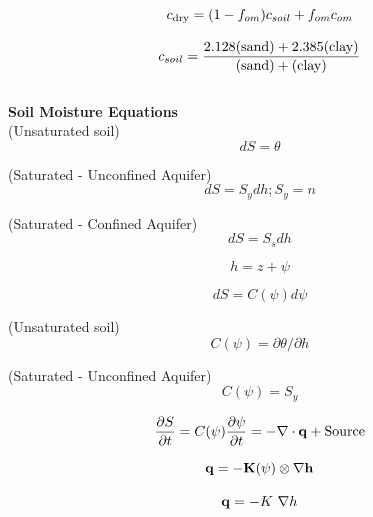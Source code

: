 \documentclass{article}
\begin{document}
\begin{equation}
c_{\rm dry} = (1-f_{om})c_{soil} + f_{om}c_{om}
\end{equation}

\begin{equation}
c_{soil} = {\rm \frac{2.128 (sand)+ 2.385 (clay)}{(sand) + (clay)}}
\end{equation}  \\



\textbf{Soil Moisture Equations} \\

(Unsaturated soil)
\begin{equation}
 dS=\theta 
\end{equation}

(Saturated - Unconfined Aquifer)
\begin{equation}
 dS=S_y dh ; S_y = n
\end{equation}

(Saturated - Confined Aquifer)
\begin{equation}
 dS=S_s dh
\end{equation}

\begin{equation}
 h=z+\psi
\end{equation}

\begin{equation}
dS = C(\psi)d\psi
\end{equation}

(Unsaturated soil)
\begin{equation}
C(\psi)=\partial \theta /\partial h 
\end{equation}

(Saturated  - Unconfined Aquifer)
\begin{equation}
C(\psi)=S_y 
\end{equation}

\begin{equation}
     \frac{\partial S}{\partial t} = C(\psi)\frac{\partial \psi}{\partial t} = -\nabla \cdot {\bf{q}} + {\rm Source}
\label{Richards}
\end{equation}

\begin{equation}
     \bf{q} = - \mathbf{K}(\psi) \otimes \nabla h
\end{equation}

\begin{equation}
     {\bf{q}} = - K \ \nabla h
\end{equation}
\end{document}
